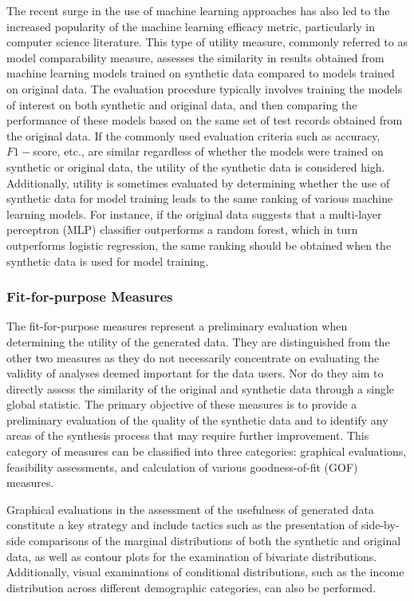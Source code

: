 The recent surge in the use of machine learning approaches has also led to the increased popularity of the machine learning efficacy metric, particularly in computer science literature. This type of utility measure, commonly referred to as model comparability measure, assesses the similarity in results obtained from machine learning models trained on synthetic data compared to models trained on original data. The evaluation procedure typically involves training the models of interest on both synthetic and original data, and then comparing the performance of these models based on the same set of test records obtained from the original data. If the commonly used evaluation criteria such as accuracy, $F1-$score, etc., are similar regardless of whether the models were trained on synthetic or original data, the utility of the synthetic data is considered high. Additionally, utility is sometimes evaluated by determining whether the use of synthetic data for model training leads to the same ranking of various machine learning models. For instance, if the original data suggests that a multi-layer perceptron (MLP) classifier outperforms a random forest, which in turn outperforms logistic regression, the same ranking should be obtained when the synthetic data is used for model training.
\subsubsection{Fit-for-purpose Measures}
\label{subsubsec:purpose}
The fit-for-purpose measures represent a preliminary evaluation when determining the utility of the generated data. They are distinguished from the other two measures as they do not necessarily concentrate on evaluating the validity of analyses deemed important for the data users. Nor do they aim to directly assess the similarity of the original and synthetic data through a single global statistic. The primary objective of these measures is to provide a preliminary evaluation of the quality of the synthetic data and to identify any areas of the synthesis process that may require further improvement. This category of measures can be classified into three categories: graphical evaluations, feasibility assessments, and calculation of various goodness-of-fit (GOF) measures.

Graphical evaluations in the assessment of the usefulness of generated data constitute a key strategy and include tactics such as the presentation of side-by-side comparisons of the marginal distributions of both the synthetic and original data, as well as contour plots for the examination of bivariate distributions. Additionally, visual examinations of conditional distributions, such as the income distribution across different demographic categories, can also be performed.

